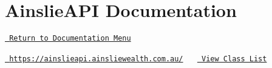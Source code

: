 \chapter{Ainslie\+API Documentation}
\hypertarget{index}{}\label{index}
 \href{https://oscarmiike.github.io}{\texttt{ Return to Documentation Menu}} 

 \href{https://ainslieapi.ainsliewealth.com.au/}{\texttt{ https\+://ainslieapi.\+ainsliewealth.\+com.\+au/}}~\newline
~\newline
 \href{annotated.html}{\texttt{ View Class List}}  